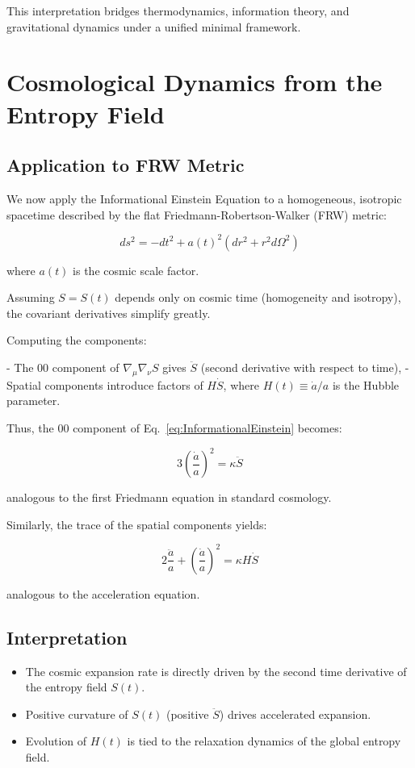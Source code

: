 \documentclass{article}
\begin{document}
This interpretation bridges thermodynamics, information theory, and gravitational dynamics under a unified minimal framework.

\section{Cosmological Dynamics from the Entropy Field}

\subsection{Application to FRW Metric}

We now apply the Informational Einstein Equation to a homogeneous, isotropic spacetime described by the flat Friedmann-Robertson-Walker (FRW) metric:

\begin{equation}
ds^2 = -dt^2 + a(t)^2 \left( dr^2 + r^2 d\Omega^2 \right)
\end{equation}

where $a(t)$ is the cosmic scale factor.

Assuming $S = S(t)$ depends only on cosmic time (homogeneity and isotropy), the covariant derivatives simplify greatly.

Computing the components:

- The $00$ component of $\nabla_\mu \nabla_\nu S$ gives $\ddot{S}$ (second derivative with respect to time),
- Spatial components introduce factors of $H \dot{S}$, where $H(t) \equiv \dot{a}/a$ is the Hubble parameter.

Thus, the $00$ component of Eq.~\eqref{eq:InformationalEinstein} becomes:

\begin{equation}
3\left( \frac{\dot{a}}{a} \right)^2 = \kappa \ddot{S}
\label{eq:FriedmannEntropy}
\end{equation}

analogous to the first Friedmann equation in standard cosmology.

Similarly, the trace of the spatial components yields:

\begin{equation}
2\frac{\ddot{a}}{a} + \left( \frac{\dot{a}}{a} \right)^2 = \kappa H \dot{S}
\label{eq:AccelerationEntropy}
\end{equation}

analogous to the acceleration equation.

\subsection{Interpretation}
\begin{itemize}
\item The cosmic expansion rate is directly driven by the second time derivative of the entropy field $S(t)$.
\item Positive curvature of $S(t)$ (positive $\ddot{S}$) drives accelerated expansion.
\item Evolution of $H(t)$ is tied to the relaxation dynamics of the global entropy field.
\end{itemize}
\end{document}

